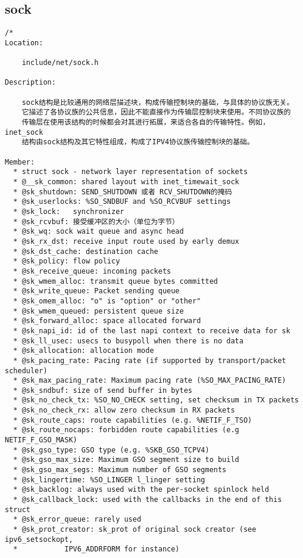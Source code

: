         \subsection{sock}
\begin{verbatim}
/*
Location:

	include/net/sock.h

Description:

	sock结构是比较通用的网络层描述块，构成传输控制块的基础，与具体的协议族无关。
	它描述了各协议族的公共信息，因此不能直接作为传输层控制块来使用。不同协议族的
	传输层在使用该结构的时候都会对其进行拓展，来适合各自的传输特性。例如，inet_sock
	结构由sock结构及其它特性组成，构成了IPV4协议族传输控制块的基础。

Member:
  * struct sock - network layer representation of sockets
  * @__sk_common: shared layout with inet_timewait_sock
  * @sk_shutdown: SEND_SHUTDOWN 或者 RCV_SHUTDOWN的掩码
  * @sk_userlocks: %SO_SNDBUF and %SO_RCVBUF settings
  * @sk_lock:   synchronizer
  * @sk_rcvbuf: 接受缓冲区的大小（单位为字节）
  * @sk_wq: sock wait queue and async head
  * @sk_rx_dst: receive input route used by early demux
  * @sk_dst_cache: destination cache
  * @sk_policy: flow policy
  * @sk_receive_queue: incoming packets
  * @sk_wmem_alloc: transmit queue bytes committed
  * @sk_write_queue: Packet sending queue
  * @sk_omem_alloc: "o" is "option" or "other"
  * @sk_wmem_queued: persistent queue size
  * @sk_forward_alloc: space allocated forward
  * @sk_napi_id: id of the last napi context to receive data for sk
  * @sk_ll_usec: usecs to busypoll when there is no data
  * @sk_allocation: allocation mode
  * @sk_pacing_rate: Pacing rate (if supported by transport/packet scheduler)
  * @sk_max_pacing_rate: Maximum pacing rate (%SO_MAX_PACING_RATE)
  * @sk_sndbuf: size of send buffer in bytes
  * @sk_no_check_tx: %SO_NO_CHECK setting, set checksum in TX packets
  * @sk_no_check_rx: allow zero checksum in RX packets
  * @sk_route_caps: route capabilities (e.g. %NETIF_F_TSO)
  * @sk_route_nocaps: forbidden route capabilities (e.g NETIF_F_GSO_MASK)
  * @sk_gso_type: GSO type (e.g. %SKB_GSO_TCPV4)
  * @sk_gso_max_size: Maximum GSO segment size to build
  * @sk_gso_max_segs: Maximum number of GSO segments
  * @sk_lingertime: %SO_LINGER l_linger setting
  * @sk_backlog: always used with the per-socket spinlock held
  * @sk_callback_lock: used with the callbacks in the end of this struct
  * @sk_error_queue: rarely used
  * @sk_prot_creator: sk_prot of original sock creator (see ipv6_setsockopt,
  *           IPV6_ADDRFORM for instance)

\end{verbatim}
